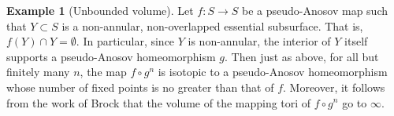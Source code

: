 \documentclass[11pt,letterpaper]{amsart}
\numberwithin{equation}{section}
\theoremstyle{definition}
\newtheorem{example}[theorem]{Example}
\begin{document}
\begin{example}[Unbounded volume] \label{ex:vol}
Let $f \colon S \to S$ be a pseudo-Anosov map such that $Y \subset S$ is a non-annular, non-overlapped essential subsurface. That is, $f(Y) \cap Y = \emptyset$. In particular, since $Y$ is non-annular, the interior of $Y$ itself supports a pseudo-Anosov homeomorphism $g$. Then just as above, for all but finitely many $n$, the map $f \circ g^n$ is isotopic to a pseudo-Anosov homeomorphism whose number of fixed points is no greater than that of $f$. Moreover, it follows from
the work of Brock \cite{Brock:fibered} that the volume of the mapping tori of $f \circ g^n$ go to $\infty$.
\end{example}








\end{document}
